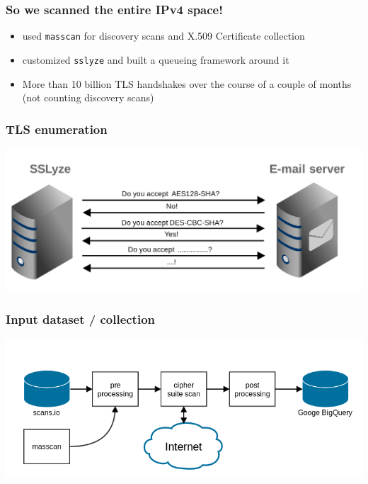 \documentclass[14pt,aspectratio=43]{beamer}
\begin{document}
\begin{frame}
  \frametitle{So we scanned the entire IPv4 space!}
  \begin{itemize}
    \item used \texttt{masscan} for discovery scans and X.509 Certificate collection
    \item customized \texttt{sslyze} and built a queueing framework around it
    \item More than 10 billion TLS handshakes over the course of a couple of months (not counting discovery scans)
  \end{itemize}
\end{frame}

\begin{frame}
  \frametitle{TLS enumeration}
  \begin{center}
    \includegraphics*[scale=0.13]{images/dummy_scan_da.png}
  \end{center}
\end{frame}

\begin{frame}
  \frametitle{Input dataset / collection}
  \begin{center}
    \includegraphics*[scale=0.4]{images/general_process.png}
  \end{center}
\end{frame}
\end{document}
